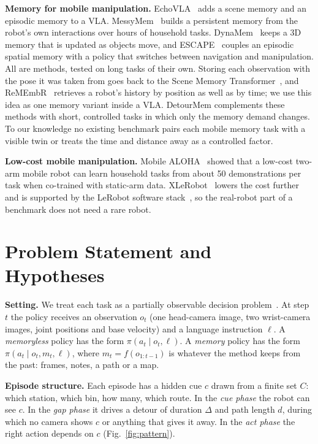 \documentclass[conference]{IEEEtran}
\begin{document}
\textbf{Memory for mobile manipulation.} EchoVLA~\cite{lin2025echovla} adds a scene memory and an episodic memory to a VLA. MessyMem~\cite{banwasi2026messymem} builds a persistent memory from the robot's own interactions over hours of household tasks. DynaMem~\cite{liu2024dynamem} keeps a 3D memory that is updated as objects move, and ESCAPE~\cite{qian2026escape} couples an episodic spatial memory with a policy that switches between navigation and manipulation. All are methods, tested on long tasks of their own. Storing each observation with the pose it was taken from goes back to the Scene Memory Transformer~\cite{fang2019smt}, and ReMEmbR~\cite{anwar2024remembr} retrieves a robot's history by position as well as by time; we use this idea as one memory variant inside a VLA. DetourMem complements these methods with short, controlled tasks in which only the memory demand changes. To our knowledge no existing benchmark pairs each mobile memory task with a visible twin or treats the time and distance away as a controlled factor.

\textbf{Low-cost mobile manipulation.} Mobile ALOHA~\cite{fu2025mobilealoha} showed that a low-cost two-arm mobile robot can learn household tasks from about 50 demonstrations per task when co-trained with static-arm data. XLeRobot~\cite{wang2025xlerobot} lowers the cost further and is supported by the LeRobot software stack~\cite{cadene2026lerobot}, so the real-robot part of a benchmark does not need a rare robot.

\section{Problem Statement and Hypotheses}
\label{sec:problem}

\textbf{Setting.} We treat each task as a partially observable decision problem~\cite{kaelbling1998pomdp}. At step $t$ the policy receives an observation $o_t$ (one head-camera image, two wrist-camera images, joint positions and base velocity) and a language instruction $\ell$. A \emph{memoryless} policy has the form $\pi(a_t \mid o_t, \ell)$. A \emph{memory} policy has the form $\pi(a_t \mid o_t, m_t, \ell)$, where $m_t = f(o_{1:t-1})$ is whatever the method keeps from the past: frames, notes, a path or a map.

\textbf{Episode structure.} Each episode has a hidden cue $c$ drawn from a finite set $C$: which station, which bin, how many, which route. In the \emph{cue phase} the robot can see $c$. In the \emph{gap phase} it drives a detour of duration $\Delta$ and path length $d$, during which no camera shows $c$ or anything that gives it away. In the \emph{act phase} the right action depends on $c$ (Fig.~\ref{fig:pattern}).
\end{document}
